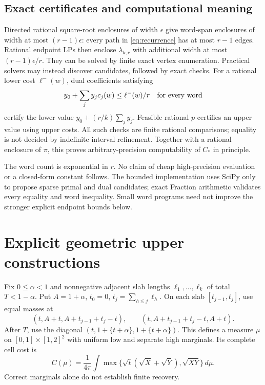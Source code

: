 \documentclass[11pt]{article}
\theoremstyle{definition}\newtheorem{definition}[theorem]{Definition}
\theoremstyle{remark}\newtheorem{remark}[theorem]{Remark}
\newcommand{\CC}{C_\ast}
\begin{document}
\subsection{Exact certificates and computational meaning}
Directed rational square-root enclosures of width $\epsilon$ give
word-span enclosures of width at most $(r-1)\epsilon$: every path in
\eqref{eq:recurrence} has at most $r-1$ edges. Rational endpoint LPs
then enclose $\lambda_{k,r}$ with additional width at most
$(r-1)\epsilon/r$. They can be solved by finite exact vertex enumeration.
Practical solvers may instead discover candidates, followed by exact checks.
For a rational lower cost $\ell^-(w)$, dual coefficients satisfying
\[
 y_0+\sum_j y_jc_j(w)\le\ell^-(w)/r\quad\hbox{for every word}
\]
certify the lower value $y_0+(r/k)\sum_jy_j$. Feasible rational $p$
certifies an upper value using upper costs. All such checks are finite
rational comparisons; equality is not decided by indefinite interval
refinement. Together with a rational enclosure of $\pi$, this proves
arbitrary-precision computability of $\CC$ in principle.

The word count is exponential in $r$. No claim of cheap high-precision
evaluation or a closed-form constant follows. The bounded implementation
uses SciPy only to propose sparse primal and dual candidates; exact Fraction
arithmetic validates every equality and word inequality. Small word programs
need not improve the stronger explicit endpoint bounds below.

\section{Explicit geometric upper constructions}\label{sec:upper}

Fix $0\le\alpha<1$ and nonnegative adjacent slab lengths
$\ell_1,\ldots,\ell_k$ of total $T<1-\alpha$. Put $A=1+\alpha$,
$t_0=0$, $t_j=\sum_{h\le j}\ell_h$. On each slab
$[t_{j-1},t_j]$, use equal masses at
\[
 (t,A+t,A+t_{j-1}+t_j-t),\qquad
 (t,A+t_{j-1}+t_j-t,A+t).
\]
After $T$, use the diagonal $(t,1+\{t+\alpha\},1+\{t+\alpha\})$.
This defines a measure $\mu$ on $[0,1]\times[1,2]^2$ with uniform low
and separate high marginals. Its complete cell cost is
\begin{equation}\label{eq:blockcost}
 C(\mu)=\frac1{4\pi}\int
 \max\{\sqrt t(\sqrt X+\sqrt Y),\sqrt{XY}\}\,d\mu.
\end{equation}
Correct marginals alone do not establish finite recovery.
\end{document}
